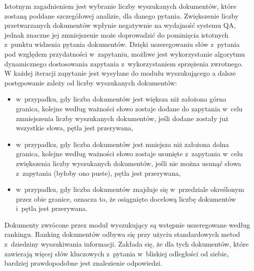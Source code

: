 \documentclass[a4paper, twoside, 12pt]{report}
\begin{document}
            Istotnym zagadnieniem jest wybranie liczby wyszukanych dokumentów, które zostaną poddane szczegółowej
            analizie, dla danego pytania. Zwiększenie liczby przetwarzanych dokumentów wpłynie negatywnie na wydajność
            systemu QA, jednak znaczne jej zmniejszenie może doprowadzić do pominięcia istotnych z~punktu widzenia
            pytania dokumentów. Dzięki uszeregowaniu słów z~pytania pod względem przydatności w~zapytaniu, możliwe
            jest wykorzystanie algorytmu dynamicznego dostosowania zapytania z~wykorzystaniem sprzężenia zwrotnego.
            W każdej iteracji zapytanie jest wysyłane do modułu wyszukującego a dalsze postępowanie zależy od liczby
            wyszukanych dokumentów:
            \begin{itemize}
                \item w~przypadku, gdy liczba dokumentów jest większa niż założona górna granica, kolejne według ważności
                    słowo zostaje dodane do zapytania w~celu zmniejszenia liczby wyszukanych dokumentów, jeśli dodane zostały już
                    wszystkie słowa, pętla jest przerywana,
                \item w~przypadku, gdy liczba dokumentów jest mniejsza niż założona dolna granica, kolejne według ważności
                    słowo zostaje usunięte z~zapytania w~celu zwiększenia liczby wyszukanych dokumentów, jeśli nie można
                    usunąć słowa z~zapytania (byłoby ono puste), pętla jest przerywana,
                \item w~przypadku, gdy liczba dokumentów znajduje się w~przedziale określonym przez obie granice,
                    oznacza to, że osiągnięto docelową liczbę dokumentów i~pętla jest przerywana.
            \end{itemize}

            Dokumenty zwrócone przez moduł wyszukujący są wstępnie uszeregowane według rankingu. Ranking dokumentów
            odbywa się przy użyciu standardowych metod z~dziedziny wyszukiwania informacji. Zakłada się, że dla tych
            dokumentów, które zawierają więcej słów kluczowych z~pytania w~bliskiej odległości od siebie, bardziej
            prawdopodobne jest znalezienie odpowiedzi.
\end{document}
